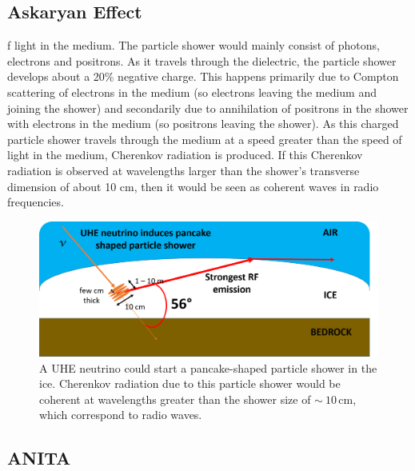 \subsection{Askaryan Effect}

f light in the medium. The particle shower would mainly consist of photons, electrons and positrons. As it travels through the dielectric, the particle shower develops about a 20\% negative charge. This happens primarily due to Compton scattering of electrons in the medium (so electrons leaving the medium and joining the shower) and secondarily due to annihilation of positrons in the shower with electrons in the medium (so positrons leaving the shower).   
As this charged particle shower travels through the medium at a speed greater than the speed of light in the medium, Cherenkov radiation is produced. If this Cherenkov radiation is observed at wavelengths larger than the shower's transverse dimension of about 10 cm, then it would be seen as coherent waves in radio frequencies. 

\begin{figure}
\centering
\includegraphics[width=1.0\textwidth]{figures/askaryan_in_ice.png}
\caption{A UHE neutrino could start a pancake-shaped particle shower in the ice.
Cherenkov radiation due to this particle shower would be coherent at wavelengths 
greater than the shower size of $\sim~10\,\mbox{cm}$, which correspond to radio waves.}
\label{askaryan}
\end{figure}


\subsection{ANITA}

